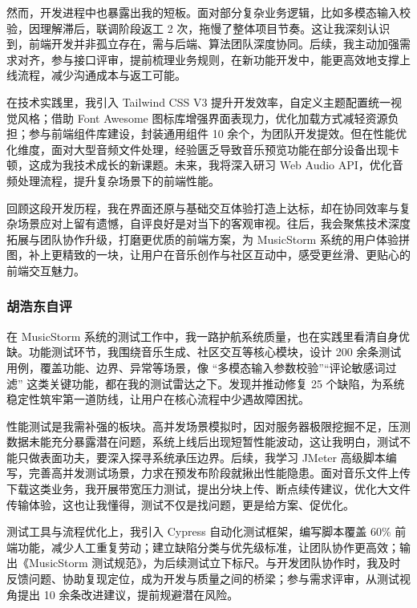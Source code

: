 \documentclass{base}
\numberwithin{figure}{section} %
\begin{document}
然而，开发进程中也暴露出我的短板。面对部分复杂业务逻辑，比如多模态输入校验，因理解滞后，联调阶段返工 2 次，拖慢了整体项目节奏。这让我深刻认识到，前端开发并非孤立存在，需与后端、算法团队深度协同。后续，我主动加强需求对齐，参与接口评审，提前梳理业务规则，在新功能开发中，能更高效地支撑上线流程，减少沟通成本与返工可能。

在技术实践里，我引入 Tailwind CSS V3 提升开发效率，自定义主题配置统一视觉风格；借助 Font Awesome 图标库增强界面表现力，优化加载方式减轻资源负担；参与前端组件库建设，封装通用组件 10 余个，为团队开发提效。但在性能优化维度，面对大型音频文件处理，经验匮乏导致音乐预览功能在部分设备出现卡顿，这成为我技术成长的新课题。未来，我将深入研习 Web Audio API，优化音频处理流程，提升复杂场景下的前端性能。

回顾这段开发历程，我在界面还原与基础交互体验打造上达标，却在协同效率与复杂场景应对上留有遗憾，自评良好是对当下的客观审视。往后，我会聚焦技术深度拓展与团队协作升级，打磨更优质的前端方案，为 MusicStorm 系统的用户体验拼图，补上更精致的一块，让用户在音乐创作与社区互动中，感受更丝滑、更贴心的前端交互魅力。

\vfill
\pagebreak
\clearpage
\thispagestyle{empty}
\null
\newpage

\subsubsection{胡浩东自评}

在 MusicStorm 系统的测试工作中，我一路护航系统质量，也在实践里看清自身优缺。功能测试环节，我围绕音乐生成、社区交互等核心模块，设计 200 余条测试用例，覆盖功能、边界、异常等场景，像 “多模态输入参数校验”“评论敏感词过滤” 这类关键功能，都在我的测试雷达之下。发现并推动修复 25 个缺陷，为系统稳定性筑牢第一道防线，让用户在核心流程中少遇故障困扰。

性能测试是我需补强的板块。高并发场景模拟时，因对服务器极限挖掘不足，压测数据未能充分暴露潜在问题，系统上线后出现短暂性能波动，这让我明白，测试不能只做表面功夫，要深入探寻系统承压边界。后续，我学习 JMeter 高级脚本编写，完善高并发测试场景，力求在预发布阶段就揪出性能隐患。面对音乐文件上传下载这类业务，我开展带宽压力测试，提出分块上传、断点续传建议，优化大文件传输体验，这也让我懂得，测试不仅是找问题，更是给方案、促优化。

测试工具与流程优化上，我引入 Cypress 自动化测试框架，编写脚本覆盖 60\% 前端功能，减少人工重复劳动；建立缺陷分类与优先级标准，让团队协作更高效；输出《MusicStorm 测试规范》，为后续测试立下标尺。与开发团队协作时，我及时反馈问题、协助复现定位，成为开发与质量之间的桥梁；参与需求评审，从测试视角提出 10 余条改进建议，提前规避潜在风险。
\end{document}
